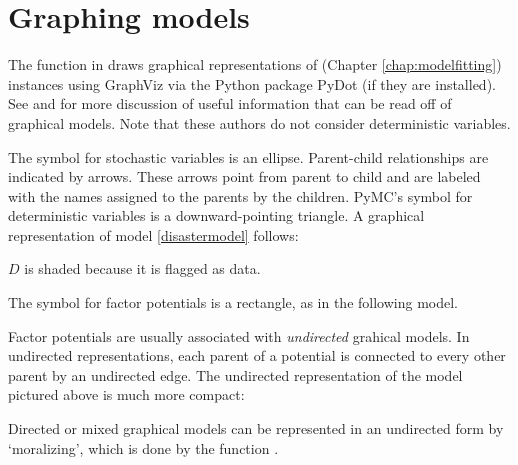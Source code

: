 \hypertarget{graphical}{}
\section{Graphing models} \label{graphical}

The function  in  draws graphical representations of  (Chapter \ref{chap:modelfitting}) instances using GraphViz via the Python package PyDot (if they are installed). See \cite{dawidmarkov} and \cite{Jordan:2004p5439} for more discussion of useful information that can be read off of graphical models. Note that these authors do not consider deterministic variables.

The symbol for stochastic variables is an ellipse. Parent-child relationships are indicated by arrows. These arrows point from parent to child and are labeled with the names assigned to the parents by the children. PyMC's symbol for deterministic variables is a downward-pointing triangle. A graphical representation of model \ref{disastermodel} follows:
\begin{center}
\end{center}
$D$ is shaded because it is flagged as data.


The symbol for factor potentials is a rectangle, as in the following model.
\begin{center}
\end{center}
Factor potentials are usually associated with \emph{undirected} grahical models. In undirected representations, each parent of a potential is connected to every other parent by an undirected edge. The undirected representation of the model pictured above is much more compact:
\begin{center}
\end{center}
Directed or mixed graphical models can be represented in an undirected form by `moralizing', which is done by the function .


